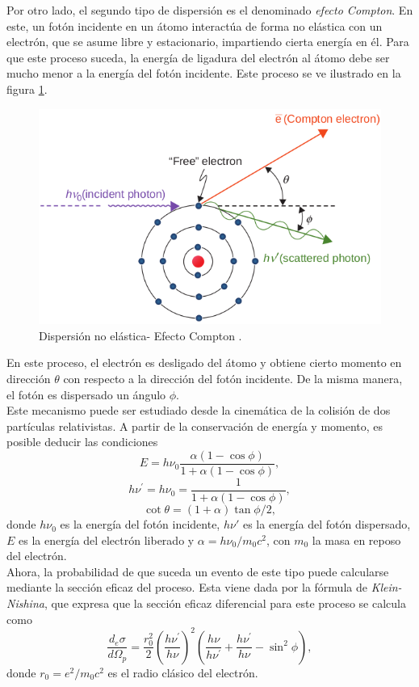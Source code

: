 Por otro lado, el segundo tipo de dispersión es el denominado \textit{efecto Compton}. En este, un fotón incidente en un átomo interactúa de forma no elástica con un electrón, que se asume libre y estacionario, impartiendo cierta energía en él. Para que este proceso suceda, la energía de ligadura del electrón al átomo debe ser mucho menor a la energía del fotón incidente. Este proceso se ve ilustrado en la figura \ref{fig:compton}.\\
\begin{figure}[H]
	\centering
	\includegraphics[width=0.7\linewidth]{images/compton.png}
	\caption{Dispersión no elástica- Efecto Compton \cite{khan2014the}.}
	\label{fig:compton}
\end{figure}
En este proceso, el electrón es desligado del átomo y obtiene cierto momento en dirección $\theta$ con respecto a la dirección del fotón incidente. De la misma manera, el fotón es dispersado un ángulo $\phi$. \\

Este mecanismo puede ser estudiado desde la cinemática de la colisión de dos partículas relativistas. A partir de la conservación de energía y momento, es posible deducir las condiciones 
\begin{equation}
E=h \nu_{0} \frac{\alpha(1-\cos \phi)}{1+\alpha(1-\cos \phi)},
\end{equation}
\begin{equation}
h \nu^{\prime}=h \nu_{0}=\frac{1}{1+\alpha(1-\cos \phi)},
\end{equation}
\begin{equation}
\cot \theta=(1+\alpha) \tan \phi / 2,
\end{equation}
donde $h\nu_0$ es la energía del fotón incidente, $h\nu'$ es la energía del fotón dispersado, $E$ es la energía del electrón liberado y $\alpha=h\nu_0/m_0c^2$, con $m_0$ la masa en reposo del electrón. \\

Ahora, la probabilidad de que suceda un evento de este tipo puede calcularse mediante la sección eficaz del proceso. Esta viene dada por la fórmula de \textit{Klein-Nishina}, que expresa que la sección eficaz diferencial para este proceso se calcula como
\begin{equation}
\label{eqn:KleinNishina}
\frac{d_{e} \sigma}{d \Omega_{p}}=\frac{r_{0}^{2}}{2}\left(\frac{h \nu^{\prime}}{h \nu}\right)^{2}\left(\frac{h \nu}{h \nu^{\prime}}+\frac{h \nu^{\prime}}{h \nu}-\sin ^{2} \phi\right),
\end{equation}
donde $r_0=e^2/m_0c^2$ es el radio clásico del electrón\cite{Weinberg1995}.\\

